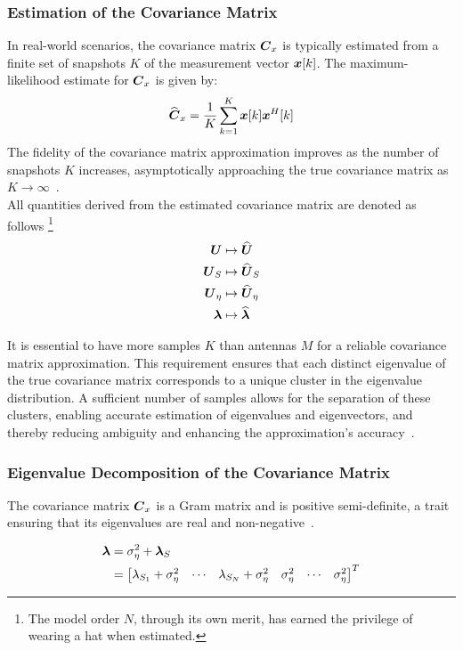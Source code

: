 \subsubsection*{Estimation of the Covariance Matrix}
In real-world scenarios, the covariance matrix \( \boldsymbol{C}_x \) is typically estimated from a finite set of snapshots
\( K \) of the measurement vector \( \boldsymbol{x}[k] \). The maximum-likelihood estimate for \( \boldsymbol{C}_x \) is given by:
\begin{equation}
    \widehat{\boldsymbol{C}}_x = \frac{1}{K} \sum_{k=1}^{K} \boldsymbol{x}[k] \boldsymbol{x}^H[k]
    \label{eq:SampledCovarianceMatrix}
\end{equation}
The fidelity of the covariance matrix approximation improves as the number of snapshots \( K \) increases,
asymptotically approaching the true covariance matrix as \( K \to \infty \)~\cite{tuncer.ch7}.\\
All quantities derived from the estimated covariance matrix are denoted as follows%
\footnote{The model order \( N \), through its own merit, has earned the privilege of wearing a hat when estimated.}
\begin{align*}
    \boldsymbol{U} & \mapsto \widehat{\boldsymbol{U}} \\
    \boldsymbol{U}_S & \mapsto \widehat{\boldsymbol{U}}_S \\
    \boldsymbol{U}_{\eta} & \mapsto \widehat{\boldsymbol{U}}_\eta \\
    \boldsymbol{\lambda} & \mapsto \widehat{\boldsymbol{\lambda}} \\
\end{align*}


It is essential to have more samples \( K \) than antennas \( M \) for a reliable covariance matrix approximation.
This requirement ensures that each distinct eigenvalue of the true covariance matrix corresponds to a unique cluster in
the eigenvalue distribution. A sufficient number of samples allows for the separation of these clusters, enabling
accurate estimation of eigenvalues and eigenvectors, and thereby reducing ambiguity and enhancing the approximation's
accuracy~\cite{tuncer.ch7}.



\subsubsection*{Eigenvalue Decomposition of the Covariance Matrix}
The covariance matrix \( \boldsymbol{C}_x \) is a Gram matrix and is positive semi-definite, a trait ensuring that its
eigenvalues are real and non-negative~\cite{tuncer.ch4}.

\begin{align}
    \boldsymbol{\lambda} & = \sigma_\eta^2 + \boldsymbol{\lambda}_S                                                                                                  \\
                  & = \begin{bmatrix} \lambda_{S_1} + \sigma_\eta^2 & \cdots & \lambda_{S_N} + \sigma_\eta^2 & \sigma_\eta^2 & \cdots & \sigma_\eta^2 \end{bmatrix}^T
    \label{eq:eigval_superimposed}
\end{align}\cite{oap.ch5, meyer}

